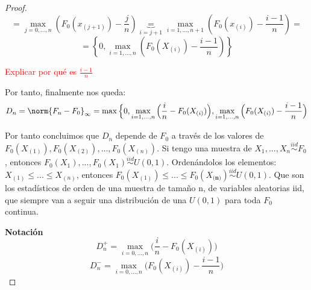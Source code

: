 \documentclass[nochap]{apuntes}
\begin{document}
\begin{proof}
\[= \max_{j=0,…,n} \left( F_0(x_{(j+1)}) - \frac{j}{n} \right) \underbrace{=}_{i=j+1} \max_{i=1,…,n+1} \left( F_0(x_{(i)}) - \frac{i-1}{n} \right) =  \]
$$ = \left\{ 0, \max_{i=1,...,n} \left( F_0(X_{(i)}) - \frac{i-1}{n} \right) \right\} $$

\textcolor{red}{Explicar por qué es $\frac{i-1}{n}$}

Por tanto, finalmente nos queda:
$$ D_n =  \norm{F_n-F_0}_{\infty} = \max\Big\{ 0, \max_{i=1,...,n} \Big( \frac{i}{n} - F_0(X_{(i)}) \Big) , \max_{i=1,...,n} \Big( F_0(X_{(i)}) - \frac{i-1}{n} \Big)$$

Por tanto concluimos que $D_n$ depende de $F_0$ a través de los valores de $F_0(X_{(1)}), F_0(X_{(2)}),...,F_0(X_{(n)})$. Si tengo una muestra de $X_1,...,X_n \stackrel{iid}{\sim}F_0$, entonces $F_0(X_1),...,F_0(X_1) \stackrel{iid}{\sim} U(0,1)$. Ordenándolos los elementos: $X_{(1)}\leq...\leq X_{(n)}$, entonces $F_0(X_{(1)})\leq...\leq F_0(X_\textbf{{(n)}}) \stackrel{iid}{\sim} U(0,1)$. Que son los estadísticos de orden de una muestra de tamaño n, de variables aleatorias iid, que siempre van a seguir una distribución de una $U(0,1)$ para toda $F_0$ continua.

\textbf{Notación}
$$D_n^+=\max_{i=0,...,n} \Big( \frac{i}{n} - F_0(X_{(i)}) \Big)$$
$$D_n^-= \max_{i=0,...,n} \Big( F_0(X_{(i)}) - \frac{i-1}{n} \Big)$$

\end{proof}
\end{document}
